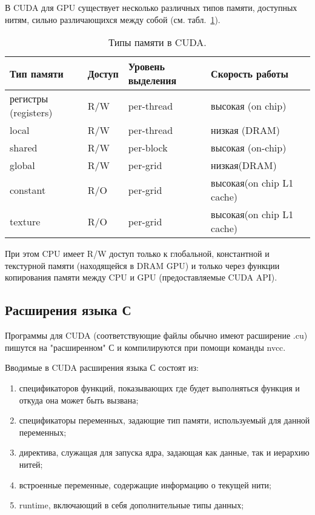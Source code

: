 В CUDA для GPU существует несколько различных типов памяти, доступных нитям, сильно различающихся между собой (см. табл.~\ref{cudatypes}).

\begin{table}[h]
\caption{\label{cudatypes} Типы памяти в CUDA.}
\begin{center}
\begin{tabular}{|l|l|l|l|}
\hline
Тип памяти	&Доступ	&Уровень выделения 	&Скорость работы \\
\hline
регистры (registers)	&R/W	&per-thread	&высокая (on chip)\\
\hline
local	&R/W	&per-thread	&низкая (DRAM)\\
\hline
shared	&R/W	&per-block	 &высокая (on-chip)\\
\hline
global	&R/W	&per-grid	&низкая(DRAM)\\
\hline
constant	&R/O 	&per-grid	&высокая(on chip L1 cache)\\
\hline
texture	&R/O	 &per-grid	&высокая(on chip L1 cache)\\
\hline
\end{tabular}
\end{center}
\end{table} 
При этом CPU имеет R/W доступ только к глобальной, константной и текстурной памяти (находящейся в DRAM GPU) и только через функции копирования памяти между CPU и GPU (предоставляемые CUDA API).

\subsection{Расширения языка С}

Программы для CUDA (соответствующие файлы обычно имеют расширение .cu) пишутся на "расширенном" С и компилируются при помощи команды nvcc.

Вводимые в CUDA расширения языка С состоят из:
\begin{enumerate}
\item спецификаторов функций, показывающих где будет выполняться функция и откуда она может быть вызвана;
\item спецификаторы переменных, задающие тип памяти, используемый для данной переменных;
\item директива, служащая для запуска ядра, задающая как данные, так и иерархию нитей;
\item встроенные переменные, содержащие информацию о текущей нити;
\item runtime, включающий в себя дополнительные типы данных;
\end{enumerate}

